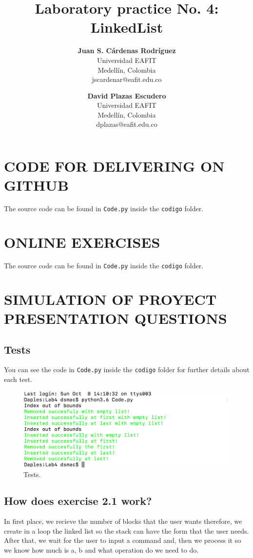 \documentclass[a4paper,12pt]{article}
\title{\color{Eblue}\textbf{Laboratory practice No. 4: LinkedList}}
\author{
  \textbf{Juan S. Cárdenas Rodríguez}\\
  Universidad EAFIT\\
  Medellín, Colombia\\
  jscardenar@eafit.edu.co
\and
  \textbf{David Plazas Escudero}\\
  Universidad EAFIT\\
  Medellín, Colombia\\
  dplazas@eafit.edu.co
}
\begin{document}
  \maketitle
  \thispagestyle{fancy}

  \section{CODE FOR DELIVERING ON GITHUB}
  The source code can be found in \texttt{Code.py} inside the \texttt{codigo} folder.

  \section{ONLINE EXERCISES}
  The source code can be found in \texttt{Code.py} inside the \texttt{codigo} folder.

  \section{SIMULATION OF PROYECT PRESENTATION QUESTIONS}
    \subsection{Tests}
    You can see the code in \texttt{Code.py} inside the \texttt{codigo}
    folder for further details about each test.
      \begin{figure}[H]
        \includegraphics[scale = 0.26]{Tests.png}
        \caption{Tests.}
      \end{figure}
    \subsection{How does exercise 2.1 work?}
    In first place, we recieve the number of blocks that the user wants therefore,
    we create in a loop the linked list so the stack can have the form that the
    user needs. After that, we wait for the user to input a command and, then
    we process it so we know how much is a, b and what operation do we need to do.
\end{document}
